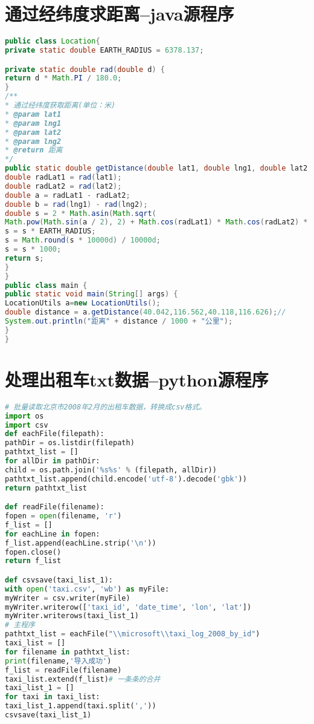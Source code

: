 \documentclass[withoutpreface,bwprint]{cumcmthesis} %
\begin{document}
\newpage
\begin{appendices}

\section{通过经纬度求距离--java源程序}

\begin{lstlisting}[language=java]
public class Location{
private static double EARTH_RADIUS = 6378.137;

private static double rad(double d) {
return d * Math.PI / 180.0;
}
/**
* 通过经纬度获取距离(单位：米)
* @param lat1
* @param lng1
* @param lat2
* @param lng2
* @return 距离
*/
public static double getDistance(double lat1, double lng1, double lat2, double lng2) {
double radLat1 = rad(lat1);
double radLat2 = rad(lat2);
double a = radLat1 - radLat2;
double b = rad(lng1) - rad(lng2);
double s = 2 * Math.asin(Math.sqrt(
Math.pow(Math.sin(a / 2), 2) + Math.cos(radLat1) * Math.cos(radLat2) * Math.pow(Math.sin(b / 2), 2)));
s = s * EARTH_RADIUS;
s = Math.round(s * 10000d) / 10000d;
s = s * 1000;
return s;
}
}
public class main {
public static void main(String[] args) {
LocationUtils a=new LocationUtils();
double distance = a.getDistance(40.042,116.562,40.118,116.626);//
System.out.println("距离" + distance / 1000 + "公里");
}
}
\end{lstlisting}
\newpage

\section{处理出租车txt数据--python源程序}

\begin{lstlisting}[language=python]
# 批量读取北京市2008年2月的出租车数据，转换成csv格式。
import os
import csv
def eachFile(filepath):
pathDir = os.listdir(filepath)
pathtxt_list = []
for allDir in pathDir:
child = os.path.join('%s%s' % (filepath, allDir))
pathtxt_list.append(child.encode('utf-8').decode('gbk'))
return pathtxt_list

def readFile(filename):
fopen = open(filename, 'r')
f_list = []
for eachLine in fopen:
f_list.append(eachLine.strip('\n'))
fopen.close()
return f_list

def csvsave(taxi_list_1):
with open('taxi.csv', 'wb') as myFile:
myWriter = csv.writer(myFile)
myWriter.writerow(['taxi_id', 'date_time', 'lon', 'lat'])
myWriter.writerows(taxi_list_1)
# 主程序
pathtxt_list = eachFile("\\microsoft\\taxi_log_2008_by_id")
taxi_list = []
for filename in pathtxt_list:
print(filename,'导入成功')
f_list = readFile(filename)
taxi_list.extend(f_list)# 一条条的合并
taxi_list_1 = []
for taxi in taxi_list:
taxi_list_1.append(taxi.split(','))
csvsave(taxi_list_1)
\end{lstlisting}
\newpage

\end{appendices}
\end{document}
